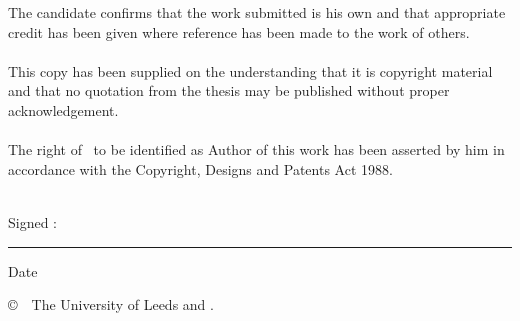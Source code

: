 
\begin{ipstatement} %

The candidate confirms that the work submitted is his own and that
appropriate credit has been given where reference has been made to
the work of others.
\\
\\
This copy has been supplied on the understanding that it is copyright
material and that no quotation from the thesis may be published
without proper acknowledgement.
\\
\\
The right of \theAuthor\ to be identified as Author of this work
has been asserted by him in accordance with the Copyright, Designs
and Patents Act 1988.
\\
\\
\vspace{1cm}

{\large Signed :\space}\rule{7cm}{0.2pt}{\large \space Date}\hrulefill\\

\hspace*{1.5cm}\theAuthor

\vspace{1cm}

\copyright\ \the\year\ The University of Leeds and \theAuthor.

\end{ipstatement}


